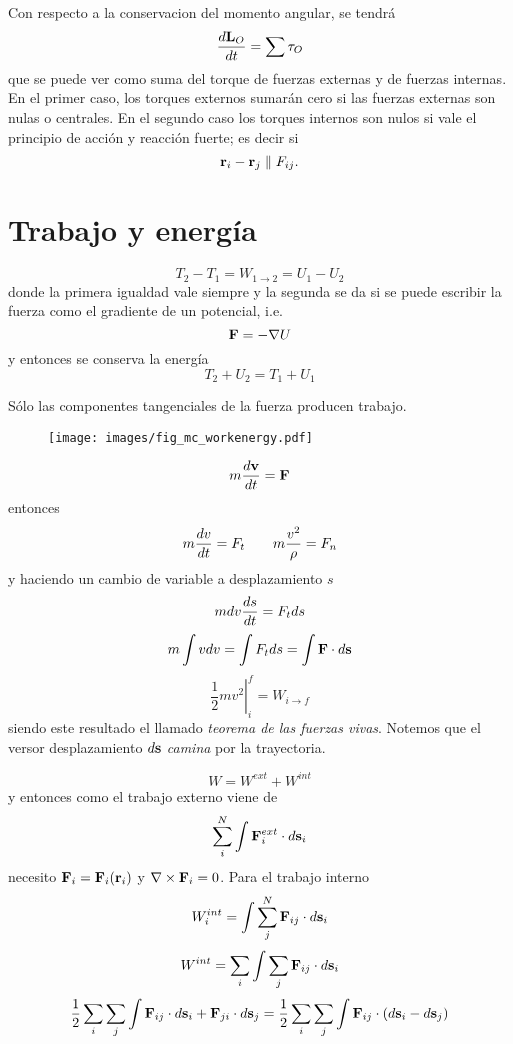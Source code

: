 \documentclass[10pt,oneside]{CBFT_book}
\begin{document}
Con respecto a la conservacion del momento angular, se tendrá
\[
	\dtot{\vb{L}_O}{t} = \sum \vb{\tau}_O
\]
que se puede ver como suma del torque de fuerzas externas y de fuerzas internas. En el primer caso,
los torques externos sumarán cero si las fuerzas externas son nulas o centrales.
En el segundo caso los torques internos son nulos si vale el principio de acción y reacción fuerte;
es decir si
\[
	\vb{r}_i - \vb{r}_j \parallel F_{ij}.
\]

\section{Trabajo y energía}

\[
	T_2 - T_1 = W_{1 \to 2} = U_1 - U_2 
\]
donde la primera igualdad vale siempre y la segunda se da si se puede escribir la fuerza como el
gradiente de un potencial, i.e.
\[
	\vb{F} = - \nabla U
\]
y entonces se conserva la energía
\[
	T_2 + U_2 = T_1 + U_1
\]

Sólo las componentes tangenciales de la fuerza producen trabajo.
\begin{figure}[hbt]
	\begin{center}
	\texttt{[image: images/fig\_mc\_workenergy.pdf]}	
	\end{center}
	\caption{}
\end{figure} 

\[
	m \dtot{\vb{v}}{t} = \vb{F}
\]
entonces
\[
	m \frac{d^{\hspace{-0.05em}} {v}}{d {t}^{\hspace{-0.05em}}} = F_t \qquad m \frac{v^2}{\rho} = F_n
\]
y haciendo un cambio de variable a desplazamiento $s$
\[
	m dv \frac{d^{\hspace{-0.05em}} {s}}{d {t}^{\hspace{-0.05em}}} = F_t ds
\]
\[
	m \int v dv = \int F_t ds = \int \vb{F} \cdot d\vb{s}
\]
\[
	\left. \frac{1}{2} m v^2 \right|_i^f = W_{i \to f}
\]
siendo este resultado el llamado {\it teorema de las fuerzas vivas}. 
Notemos que el versor desplazamiento $d\vb{s}$ {\it camina} por la trayectoria.

\[
	W = W^{ext} + W^{int}
\]
y entonces como el trabajo externo viene de 
\[
	\sum_i^N \int \vb{F}^{ext}_i \cdot d\vb{s}_i
\]
necesito $\vb{F}_i = \vb{F}_i(\vb{r}_i)$ y $\nabla \times \vb{F}_i=0$.
Para el trabajo interno
\[
	W_i^{int} = \int \sum_j^N  \vb{F}_{ij} \cdot d\vb{s}_i
\]
\[
	W^{int} = \sum_i \int \sum_j  \vb{F}_{ij} \cdot d\vb{s}_i
\]
\[
	\frac{1}{2} \sum_i \sum_j \int \vb{F}_{ij} \cdot d\vb{s}_i + \vb{F}_{ji} \cdot d\vb{s}_j =
	\frac{1}{2} \sum_i \sum_j \int \vb{F}_{ij} \cdot \left( d\vb{s}_i - d\vb{s}_j \right)
\]
\end{document}
